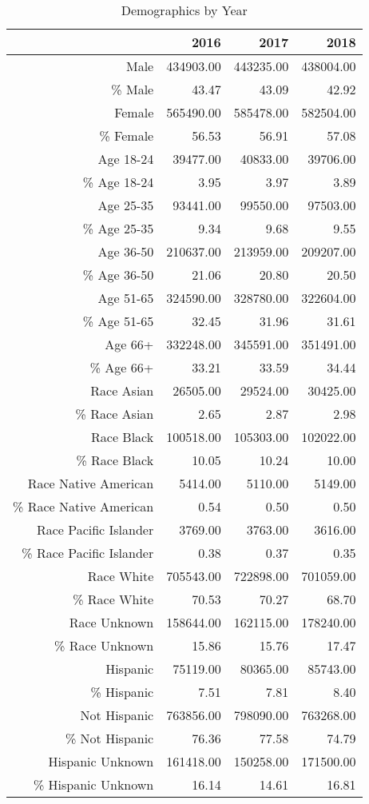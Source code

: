 \begin{table}[ht]
\centering
\begin{tabular}{rrrr}
  \hline
 & 2016 & 2017 & 2018 \\ 
  \hline
Male & 434903.00 & 443235.00 & 438004.00 \\ 
  \% Male & 43.47 & 43.09 & 42.92 \\ 
  Female & 565490.00 & 585478.00 & 582504.00 \\ 
  \% Female & 56.53 & 56.91 & 57.08 \\ 
  Age 18-24 & 39477.00 & 40833.00 & 39706.00 \\ 
  \% Age 18-24 & 3.95 & 3.97 & 3.89 \\ 
  Age 25-35 & 93441.00 & 99550.00 & 97503.00 \\ 
  \% Age 25-35 & 9.34 & 9.68 & 9.55 \\ 
  Age 36-50 & 210637.00 & 213959.00 & 209207.00 \\ 
  \% Age 36-50 & 21.06 & 20.80 & 20.50 \\ 
  Age 51-65 & 324590.00 & 328780.00 & 322604.00 \\ 
  \% Age 51-65 & 32.45 & 31.96 & 31.61 \\ 
  Age 66+ & 332248.00 & 345591.00 & 351491.00 \\ 
  \% Age 66+ & 33.21 & 33.59 & 34.44 \\ 
  Race Asian & 26505.00 & 29524.00 & 30425.00 \\ 
  \% Race Asian & 2.65 & 2.87 & 2.98 \\ 
  Race Black & 100518.00 & 105303.00 & 102022.00 \\ 
  \% Race Black & 10.05 & 10.24 & 10.00 \\ 
  Race Native American & 5414.00 & 5110.00 & 5149.00 \\ 
  \% Race Native American & 0.54 & 0.50 & 0.50 \\ 
  Race Pacific Islander & 3769.00 & 3763.00 & 3616.00 \\ 
  \% Race Pacific Islander & 0.38 & 0.37 & 0.35 \\ 
  Race White & 705543.00 & 722898.00 & 701059.00 \\ 
  \% Race White & 70.53 & 70.27 & 68.70 \\ 
  Race Unknown & 158644.00 & 162115.00 & 178240.00 \\ 
  \% Race Unknown & 15.86 & 15.76 & 17.47 \\ 
  Hispanic & 75119.00 & 80365.00 & 85743.00 \\ 
  \% Hispanic & 7.51 & 7.81 & 8.40 \\ 
  Not Hispanic & 763856.00 & 798090.00 & 763268.00 \\ 
  \% Not Hispanic & 76.36 & 77.58 & 74.79 \\ 
  Hispanic Unknown & 161418.00 & 150258.00 & 171500.00 \\ 
  \% Hispanic Unknown & 16.14 & 14.61 & 16.81 \\ 
   \hline
\end{tabular}
\caption{Demographics by Year} 
\end{table}
